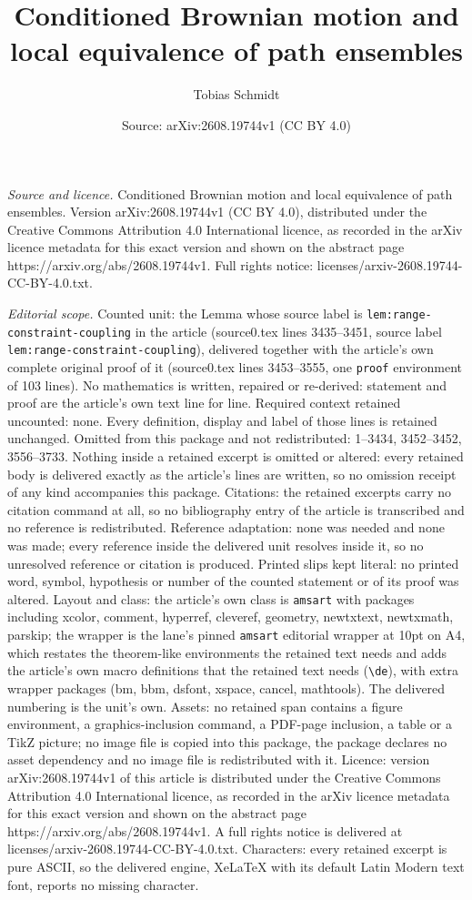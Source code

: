 \documentclass[10pt,a4paper]{amsart}
\title[Conditioned Brownian motion and local equivalence of path en]{Conditioned Brownian motion and local equivalence of path ensembles}
\author{Tobias Schmidt}
\date{Source: arXiv:2608.19744v1 (CC BY 4.0)}
\begin{document}
\maketitle

\noindent\emph{Source and licence.} Conditioned Brownian motion and local equivalence of path ensembles. Version arXiv:2608.19744v1 (CC BY 4.0), distributed under the Creative Commons Attribution 4.0 International licence, as recorded in the arXiv licence metadata for this exact version and shown on the abstract page https://arxiv.org/abs/2608.19744v1. Full rights notice: licenses/arxiv-2608.19744-CC-BY-4.0.txt.\par\smallskip

\noindent\textit{Editorial scope.} Counted unit: the Lemma whose source label is \texttt{lem:range-constraint-coupling} in the article (source0.tex lines 3435--3451, source label \texttt{lem:range-constraint-coupling}), delivered together with the article's own complete original proof of it (source0.tex lines 3453--3555, one \texttt{proof} environment of 103 lines). No mathematics is written, repaired or re-derived: statement and proof are the article's own text line for line. Required context retained uncounted: none. Every definition, display and label of those lines is retained unchanged. Omitted from this package and not redistributed: 1--3434, 3452--3452, 3556--3733. Nothing inside a retained excerpt is omitted or altered: every retained body is delivered exactly as the article's lines are written, so no omission receipt of any kind accompanies this package. Citations: the retained excerpts carry no citation command at all, so no bibliography entry of the article is transcribed and no reference is redistributed. Reference adaptation: none was needed and none was made; every reference inside the delivered unit resolves inside it, so no unresolved reference or citation is produced. Printed slips kept literal: no printed word, symbol, hypothesis or number of the counted statement or of its proof was altered. Layout and class: the article's own class is \texttt{amsart} with packages including xcolor, comment, hyperref, cleveref, geometry, newtxtext, newtxmath, parskip; the wrapper is the lane's pinned \texttt{amsart} editorial wrapper at 10pt on A4, which restates the theorem-like environments the retained text needs and adds the article's own macro definitions that the retained text needs (\texttt{\textbackslash de}), with extra wrapper packages (bm, bbm, dsfont, xspace, cancel, mathtools). The delivered numbering is the unit's own. Assets: no retained span contains a figure environment, a graphics-inclusion command, a PDF-page inclusion, a table or a TikZ picture; no image file is copied into this package, the package declares no asset dependency and no image file is redistributed with it. Licence: version arXiv:2608.19744v1 of this article is distributed under the Creative Commons Attribution 4.0 International licence, as recorded in the arXiv licence metadata for this exact version and shown on the abstract page https://arxiv.org/abs/2608.19744v1. A full rights notice is delivered at licenses/arxiv-2608.19744-CC-BY-4.0.txt. Characters: every retained excerpt is pure ASCII, so the delivered engine, XeLaTeX with its default Latin Modern text font, reports no missing character.
\end{document}
